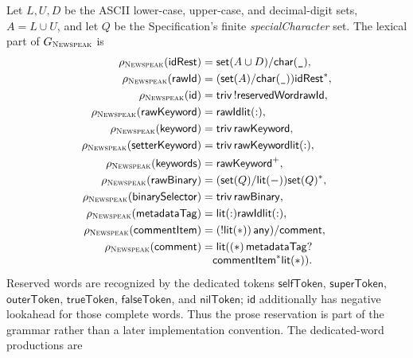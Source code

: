 Let $L,U,D$ be the ASCII lower-case, upper-case, and decimal-digit sets,
$A=L\cup U$, and let $Q$ be the Specification's finite
\emph{specialCharacter} set.  The lexical part of $G_{\textsc{Newspeak}}$ is
\begin{equation}\label{eq:newspeak-lexical-peg}
\begin{aligned}
 \rho_{\textsc{Newspeak}}(\mathsf{idRest})&=\mathsf{set}(A\cup D)/\mathsf{char}(\texttt{\_}),\\
 \rho_{\textsc{Newspeak}}(\mathsf{rawId})&=(\mathsf{set}(A)/\mathsf{char}(\texttt{\_}))
   \mathsf{idRest}^*,\\
 \rho_{\textsc{Newspeak}}(\mathsf{id})&=\mathsf{triv}\,!\mathsf{reservedWord}
      \mathsf{rawId},\\
 \rho_{\textsc{Newspeak}}(\mathsf{rawKeyword})&=\mathsf{rawId}\mathsf{lit}(:),\\
 \rho_{\textsc{Newspeak}}(\mathsf{keyword})&=\mathsf{triv}\,\mathsf{rawKeyword},\\
 \rho_{\textsc{Newspeak}}(\mathsf{setterKeyword})&=
   \mathsf{triv}\,\mathsf{rawKeyword}\mathsf{lit}(:),\\
 \rho_{\textsc{Newspeak}}(\mathsf{keywords})&=\mathsf{rawKeyword}^+,\\
 \rho_{\textsc{Newspeak}}(\mathsf{rawBinary})&=(\mathsf{set}(Q)/\mathsf{lit}(-))\mathsf{set}(Q)^*,\\
 \rho_{\textsc{Newspeak}}(\mathsf{binarySelector})&=
   \mathsf{triv}\,\mathsf{rawBinary},\\
 \rho_{\textsc{Newspeak}}(\mathsf{metadataTag})&=\mathsf{lit}(:)\mathsf{rawId}\mathsf{lit}(:),\\
 \rho_{\textsc{Newspeak}}(\mathsf{commentItem})&=
   (!\mathsf{lit}(*))\,\mathsf{any})/\mathsf{comment},\\
 \rho_{\textsc{Newspeak}}(\mathsf{comment})&=\mathsf{lit}((*)\,\mathsf{metadataTag}?\\[-1mm]
   &\quad\mathsf{commentItem}^*\mathsf{lit}(*)).
\end{aligned}
\end{equation}
Reserved words are recognized by the dedicated tokens
$\mathsf{selfToken}$, $\mathsf{superToken}$, $\mathsf{outerToken}$,
$\mathsf{trueToken}$, $\mathsf{falseToken}$, and $\mathsf{nilToken}$;
$\mathsf{id}$ additionally has negative lookahead for those complete words.
Thus the prose reservation is part of the grammar rather than a later
implementation convention.
The dedicated-word productions are
